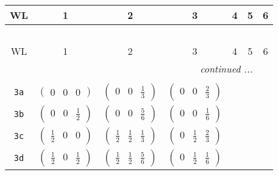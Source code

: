 \documentclass[fleqn,9pt,landscape]{jsarticle}
\begin{document}
\begin{center}
\renewcommand{\arraystretch}{1.2}
\begin{longtable}{ccccccc}
 \hline \hline
WL & 1 & 2 & 3 & 4 & 5 & 6 \\ \hline \endfirsthead

\multicolumn{6}{l}{\tablename\ \thetable{}} \\
 \hline \hline
WL & 1 & 2 & 3 & 4 & 5 & 6 \\ \hline \endhead

 \hline \hline
\multicolumn{6}{r}{\footnotesize\it continued ...} \\ \endfoot

 \hline \hline
\multicolumn{6}{r}{} \\ \endlastfoot

{\tt 3a} & $ \begin{pmatrix} 0 & 0 & 0 \end{pmatrix} $ & $ \begin{pmatrix} 0 & 0 & \frac{1}{3} \end{pmatrix} $ & $ \begin{pmatrix} 0 & 0 & \frac{2}{3} \end{pmatrix} $ & $  $ & $  $ & $  $ \\ \hline
{\tt 3b} & $ \begin{pmatrix} 0 & 0 & \frac{1}{2} \end{pmatrix} $ & $ \begin{pmatrix} 0 & 0 & \frac{5}{6} \end{pmatrix} $ & $ \begin{pmatrix} 0 & 0 & \frac{1}{6} \end{pmatrix} $ & $  $ & $  $ & $  $ \\ \hline
{\tt 3c} & $ \begin{pmatrix} \frac{1}{2} & 0 & 0 \end{pmatrix} $ & $ \begin{pmatrix} \frac{1}{2} & \frac{1}{2} & \frac{1}{3} \end{pmatrix} $ & $ \begin{pmatrix} 0 & \frac{1}{2} & \frac{2}{3} \end{pmatrix} $ & $  $ & $  $ & $  $ \\ \hline
{\tt 3d} & $ \begin{pmatrix} \frac{1}{2} & 0 & \frac{1}{2} \end{pmatrix} $ & $ \begin{pmatrix} \frac{1}{2} & \frac{1}{2} & \frac{5}{6} \end{pmatrix} $ & $ \begin{pmatrix} 0 & \frac{1}{2} & \frac{1}{6} \end{pmatrix} $ & $  $ & $  $ & $  $ \\ \hline

\end{longtable}
\end{center}
\end{document}
